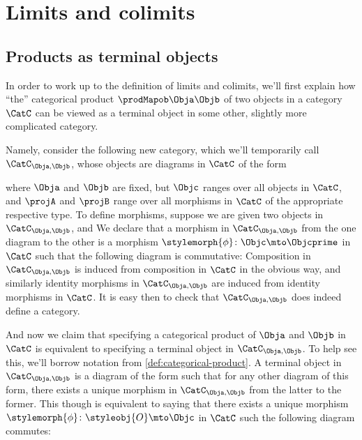 
\section{Limits and colimits}


\subsection{Products as terminal objects}

In order to work up to the definition of limits and colimits, we'll first explain how ``the'' categorical product $\prodMapob \Obja \Objb$ of two objects in a category $\CatC$ can be viewed as a terminal object in some other, slightly more complicated category.

Namely, consider the following new category, which we'll temporarily call $\CatC_{\Obja, \Objb}$, whose objects are diagrams in $\CatC$ of the form

where $\Obja$ and $\Objb$ are fixed, but $\Objc$ ranges over all objects in $\CatC$, and $\projA$ and $\projB$ range over all morphisms in $\CatC$ of the appropriate respective type.
To define morphisms, suppose we are given two objects in $\CatC_{\Obja, \Objb}$,
and
We declare that a morphism in $\CatC_{\Obja, \Objb}$ from the one diagram to the other is a morphism $\stylemorph{\phi} \colon \Objc \mto \Objcprime$ in $\CatC$ such that the following diagram is commutative:
Composition in $\CatC_{\Obja, \Objb}$ is induced from composition in $\CatC$ in the obvious way, and similarly identity morphisms in $\CatC_{\Obja, \Objb}$ are induced from identity morphisms in $\CatC$.
It is easy then to check that $\CatC_{\Obja, \Objb}$ does indeed define a category.

And now we claim that specifying a categorical product of $\Obja$ and $\Objb$ in $\CatC$ is equivalent to specifying a terminal object in $\CatC_{\Obja, \Objb}$.
To help see this, we'll borrow notation from \cref{def:categorical-product}.
A terminal object in $\CatC_{\Obja, \Objb}$ is a diagram of the form
such that for any other diagram of this form,
there exists a unique morphism in $\CatC_{\Obja, \Objb}$ from the latter to the former.
This though is equivalent to saying that there exists a unique morphism $\stylemorph{\phi} \colon \styleobj{O} \mto \Objc$ in $\CatC$ such the following diagram commutes:


